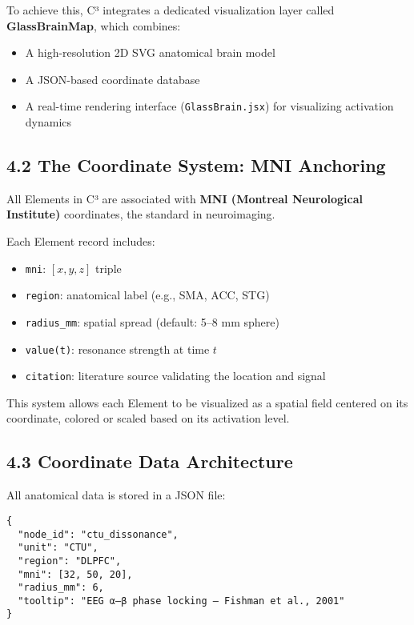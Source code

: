 To achieve this, C³ integrates a dedicated visualization layer called \textbf{GlassBrainMap}, which combines:

\begin{itemize}
    \item A high-resolution 2D SVG anatomical brain model
    \item A JSON-based coordinate database
    \item A real-time rendering interface (\texttt{GlassBrain.jsx}) for visualizing activation dynamics
\end{itemize}

\subsection*{4.2 The Coordinate System: MNI Anchoring}

All Elements in C³ are associated with \textbf{MNI (Montreal Neurological Institute)} coordinates, the standard in neuroimaging.

Each Element record includes:

\begin{itemize}
    \item \texttt{mni}: $[x, y, z]$ triple
    \item \texttt{region}: anatomical label (e.g., SMA, ACC, STG)
    \item \texttt{radius\_mm}: spatial spread (default: 5–8 mm sphere)
    \item \texttt{value(t)}: resonance strength at time $t$
    \item \texttt{citation}: literature source validating the location and signal
\end{itemize}

This system allows each Element to be visualized as a spatial field centered on its coordinate, colored or scaled based on its activation level.

\subsection*{4.3 Coordinate Data Architecture}

All anatomical data is stored in a JSON file:

\begin{verbatim}
{
  "node_id": "ctu_dissonance",
  "unit": "CTU",
  "region": "DLPFC",
  "mni": [32, 50, 20],
  "radius_mm": 6,
  "tooltip": "EEG α–β phase locking – Fishman et al., 2001"
}
\end{verbatim}

